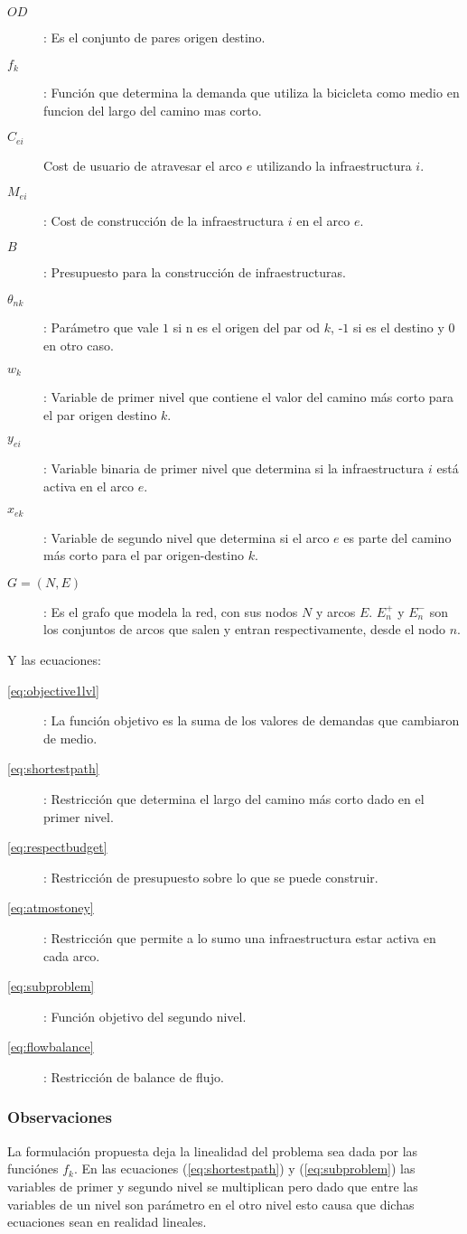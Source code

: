 \documentclass{article}
\begin{document}
  \begin{description}
    \item[$OD$]: Es el conjunto de pares origen destino.
    \item[$f_k$]: Función que determina la demanda que utiliza la bicicleta como medio en funcion del largo del camino mas corto.
    \item[$C_{ei}$] Cost de usuario de atravesar el arco $e$ utilizando la infraestructura $i$.
    \item[$M_{ei}$]: Cost de construcción de la infraestructura $i$ en el arco $e$.
    \item[$B$]: Presupuesto para la construcción de infraestructuras.
    \item[$\theta_{nk}$]: Parámetro que vale $1$ si n es el origen del par od $k$, -$1$ si es el destino y $0$ en otro caso.
    \item[$w_k$]: Variable de primer nivel que contiene el valor del camino más corto para el par origen destino $k$.
    \item[$y_{ei}$]: Variable binaria de primer nivel que determina si la infraestructura $i$ está activa en el arco $e$.
    \item[$x_{ek}$]: Variable de segundo nivel que determina si el arco $e$ es parte del camino más corto para el par origen-destino $k$.
    \item[$G=(N,E)$]: Es el grafo que modela la red, con sus nodos $N$ y arcos $E$. $E_n^+$ y $E_n^-$ son los conjuntos de arcos que salen y entran respectivamente, desde el nodo $n$.
  \end{description}

  Y las ecuaciones:

  \begin{description}
    \item[\ref{eq:objective1lvl}]: La función objetivo es la suma de los valores de demandas que cambiaron de medio.
    \item[\ref{eq:shortestpath}]: Restricción que determina el largo del camino más corto dado en el primer nivel.
    \item[\ref{eq:respectbudget}]: Restricción de presupuesto sobre lo que se puede construir.
    \item[\ref{eq:atmostoney}]: Restricción que permite a lo sumo una infraestructura estar activa en cada arco.
    \item[\ref{eq:subproblem}]: Función objetivo del segundo nivel.
    \item[\ref{eq:flowbalance}]: Restricción de balance de flujo.
  \end{description}

  \subsubsection*{Observaciones}

  La formulación propuesta deja la linealidad del problema sea dada por las funciónes $f_k$. En las ecuaciones (\ref{eq:shortestpath}) y (\ref{eq:subproblem}) las variables de primer y segundo nivel se multiplican pero dado que entre las variables de un nivel son parámetro en el otro nivel esto causa que dichas ecuaciones sean en realidad lineales.
\end{document}
